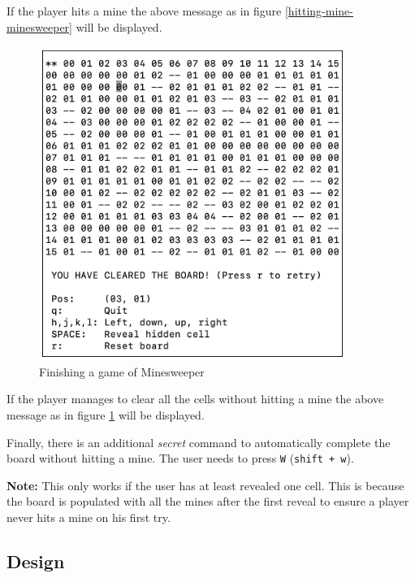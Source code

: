 \documentclass[12pt]{article}
\begin{document}
If the player hits a mine the above message as in figure
\ref{hitting-mine-minesweeper} will be displayed.

\begin{figure}[H]
    \centering
    \includegraphics[width=10cm]{./images/finishing-minesweeper.png}
    \caption{Finishing a game of Minesweeper}
    \label{finishing-minesweeper}
\end{figure}

If the player manages to clear all the cells without hitting a
mine the above message as in figure \ref{finishing-minesweeper}
will be displayed.

Finally, there is an additional \textit{secret} command to
automatically complete the board without hitting a mine. The
user needs to press \texttt{W} (\texttt{shift + w}).

\textbf{Note:} This only works if the user has at least revealed
one cell. This is because the board is populated with all the
mines after the first reveal to ensure a player never hits a
mine on his first try.

\subsection{Design}
\end{document}
